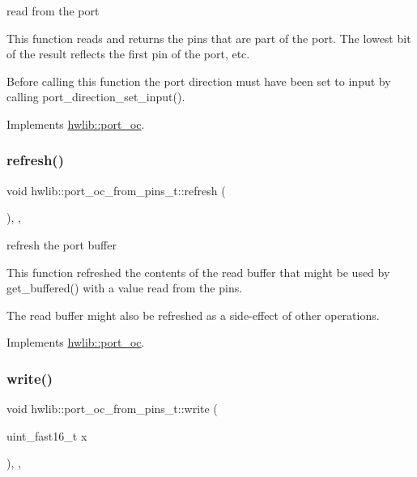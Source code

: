 read from the port

This function reads and returns the pins that are part of the port. The lowest bit of the result reflects the first pin of the port, etc.

Before calling this function the port direction must have been set to input by calling port\+\_\+direction\+\_\+set\+\_\+input(). 

Implements \hyperlink{classhwlib_1_1port__oc_a422b02326f14332df44863adced18427}{hwlib\+::port\+\_\+oc}.

\mbox{\label{classhwlib_1_1port__oc__from__pins__t_ad60c497bf92c66a9243cb933db663837}} 
\subsubsection{\texorpdfstring{refresh()}{refresh()}}
{\footnotesize\ttfamily void hwlib\+::port\+\_\+oc\+\_\+from\+\_\+pins\+\_\+t\+::refresh (\begin{DoxyParamCaption}{ }\end{DoxyParamCaption})\hspace{0.3cm}{\ttfamily [inline]}, {\ttfamily [override]}, {\ttfamily [virtual]}}





refresh the port buffer

This function refreshed the contents of the read buffer that might be used by get\+\_\+buffered() with a value read from the pins.

The read buffer might also be refreshed as a side-\/effect of other operations. 

Implements \hyperlink{classhwlib_1_1port__oc_aa4488183f5cf241ba48ad4dd1a89e42a}{hwlib\+::port\+\_\+oc}.

\mbox{\label{classhwlib_1_1port__oc__from__pins__t_af1ad5780f01e5c09d9797e69d9b35523}} 
\subsubsection{\texorpdfstring{write()}{write()}}
{\footnotesize\ttfamily void hwlib\+::port\+\_\+oc\+\_\+from\+\_\+pins\+\_\+t\+::write (\begin{DoxyParamCaption}\item[{uint\+\_\+fast16\+\_\+t}]{x }\end{DoxyParamCaption})\hspace{0.3cm}{\ttfamily [inline]}, {\ttfamily [override]}, {\ttfamily [virtual]}}





